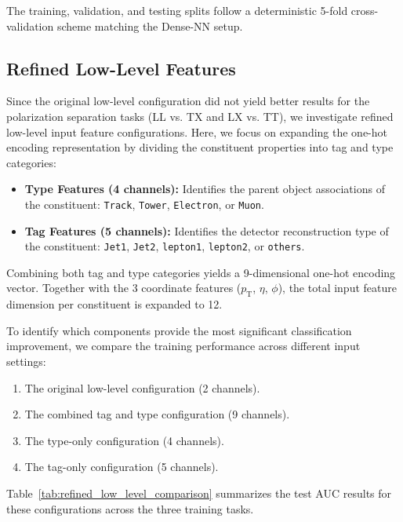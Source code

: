 \documentclass[12pt]{article}
\begin{document}
        The training, validation, and testing splits follow a deterministic 5-fold cross-validation scheme matching the Dense-NN setup.


	\subsection{Refined Low-Level Features}%
	\label{sub:refined_low_level_features}

        Since the original low-level configuration did not yield better results for the polarization separation tasks (LL vs. TX and LX vs. TT), we investigate refined low-level input feature configurations. Here, we focus on expanding the one-hot encoding representation by dividing the constituent properties into tag and type categories:
        \begin{itemize}
            \item \textbf{Type Features (4 channels):} Identifies the parent object associations of the constituent: \texttt{Track}, \texttt{Tower}, \texttt{Electron}, or \texttt{Muon}.
            \item \textbf{Tag Features (5 channels):} Identifies the detector reconstruction type of the constituent: \texttt{Jet1}, \texttt{Jet2}, \texttt{lepton1}, \texttt{lepton2}, or \texttt{others}.
        \end{itemize}
        Combining both tag and type categories yields a 9-dimensional one-hot encoding vector. Together with the 3 coordinate features ($p_{\text{T}}$, $\eta$, $\phi$), the total input feature dimension per constituent is expanded to 12.

        To identify which components provide the most significant classification improvement, we compare the training performance across different input settings:
        \begin{enumerate}
            \item The original low-level configuration (2 channels).
            \item The combined tag and type configuration (9 channels).
            \item The type-only configuration (4 channels).
            \item The tag-only configuration (5 channels).
        \end{enumerate}

        Table~\ref{tab:refined_low_level_comparison} summarizes the test AUC results for these configurations across the three training tasks.
\end{document}
